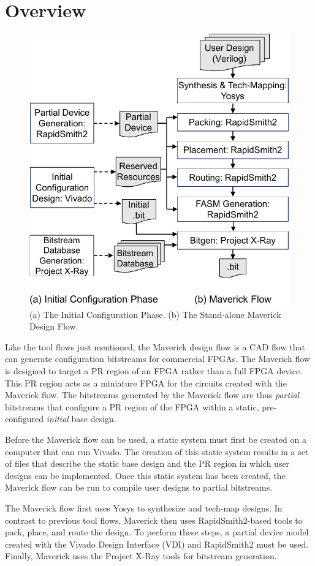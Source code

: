 \section{Overview}
\label{sec:overview}

\begin{figure}
	\centering
	\includegraphics[height=.83\columnwidth]{figures/flow_overview.pdf}
	\caption{(a) The Initial Configuration Phase. (b) The Stand-alone Maverick 
		Design Flow.}
	\label{fig:overview}
\end{figure}

Like the tool flows just mentioned, the Maverick design flow is a CAD flow that can generate configuration bitstreams for commercial FPGAs.
The Maverick flow is designed to target a PR region of an FPGA rather than a full FPGA device. 
This PR region acts as a miniature FPGA for the circuits created with the Maverick flow. 
The bitstreams generated by the Maverick flow are thus {\em partial} bitstreams that configure a PR region of the FPGA within a static, pre-configured {\em initial} base design.

Before the Maverick flow can be used, a static system must first be created on a computer that can run Vivado.
The creation of this static system results in a set of files that describe the static base design and the PR region in which user designs can be implemented.
Once this static system has been created, the Maverick flow can be run to compile user designs to partial bitstreams.

The Maverick flow first uses Yosys to synthesize and tech-map designs.
In contrast to previous tool flows, Maverick then uses RapidSmith2-based tools to pack, place, and route the design.
To perform these steps, a partial device model created with the Vivado Design Interface (VDI) and RapidSmith2 must be used.
Finally, Maverick uses the Project X-Ray tools for bitstream generation.

